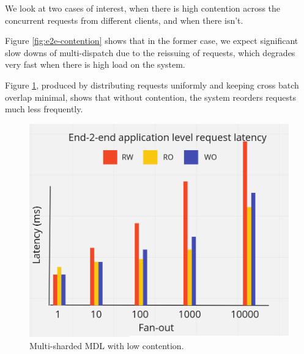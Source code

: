 We look at two cases of interest, when there is high contention across the concurrent requests from different clients, and when there isn't. 

Figure \ref{fig:e2e-contention} shows that in the former case, we expect significant slow downs of multi-dispatch due to the reissuing of requests, which degrades very fast when there is high load on the system.

Figure \ref{fig:e2e-nocontention}, produced by distributing requests uniformly and keeping cross batch overlap minimal, shows that without contention, the system reorders requests much less frequently.
\begin{figure}[!htb]
\includegraphics[scale=.22]{e2e-wo-contention.png}
\caption{Multi-sharded MDL with low contention.}
\label{fig:e2e-nocontention}
\end{figure}

